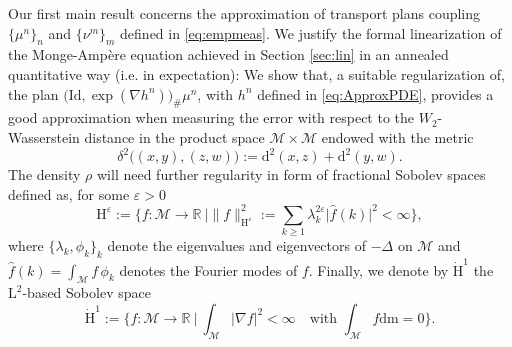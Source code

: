 \documentclass[11pt,a4paper,oneside]{amsart}
\numberwithin{equation}{section}
\newcommand{\dd}{\mathrm{d}}
\newcommand{\LL}{\mathrm{L}}
\newcommand{\m}{\mathrm{m}}
\begin{document}
%
\medskip
%

Our first main result concerns the approximation of transport plans coupling $\{\mu^n\}_n$ and $\{\nu^m\}_m$ defined in \eqref{eq:empmeas}. We justify the formal linearization of the Monge-Amp\`ere equation achieved in Section \ref{sec:lin} in an annealed quantitative way (i.e. in expectation): We show that, a suitable regularization of, the plan $\big(\text{Id},\exp(\nabla h^n)\big)_\#\mu^n$, with $h^n$ defined in \eqref{eq:ApproxPDE}, provides a good approximation when measuring the error with respect to the $W_2$-Wasserstein distance in the product space $\mathcal{M}\times\mathcal{M}$ endowed with the metric 
%
\begin{equation}\label{DistanceTransportPlan}
%
\delta^2 \big((x,y),(z,w)\big):=\dd^2(x,z)+\dd^2(y,w).
%
\end{equation}
%
The density $\rho$ will need further regularity in form of fractional Sobolev spaces defined as, for some $\varepsilon>0$
%
\begin{equation}\label{DefHepsilon}
%
\mathrm{H}^{\varepsilon}:=\Big\{f: \mathcal{M}\rightarrow\mathbb{R}\ \Big\vert \|f\|^2_{\mathrm{H}^\varepsilon}:= \sum_{k\geq 1}\lambda^{2\varepsilon}_k\vert \hat{f}(k)\vert^2<\infty\Big\},
%
\end{equation}
%
where $\{\lambda_k,\phi_k\}_{k}$ denote the eigenvalues and eigenvectors of $-\Delta$ on $\mathcal{M}$ and $\hat{f}(k)=\int_{\mathcal{M}}f\,\phi_k$ denotes the Fourier modes of $f$.
%
Finally, we denote by $\dot{\mathrm{H}}^1$ the $\LL^2$-based Sobolev space 
%
\begin{equation}\label{eq:H1}
%
\dot{\mathrm{H}}^1:=\Big\{f: \mathcal{M}\rightarrow \mathbb{R}\ \Big\vert\ \int_{\mathcal{M}}\vert \nabla f\vert^2<\infty\quad\text{with } \int_{\mathcal{M}} f\dd\m=0\Big\}.
%
\end{equation}
%
\end{document}
